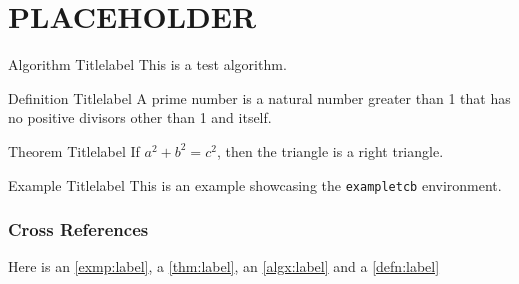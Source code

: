 \chapter{PLACEHOLDER}

\lipsum[1-10]

\begin{algorithmtcb}{Algorithm Title}{label}
    This is a test algorithm.
\end{algorithmtcb}

\begin{definitiontcb}{Definition Title}{label}
    A prime number is a natural number greater than 1 that has no positive divisors other than 1 and itself.
\end{definitiontcb}

\begin{theoremtcb}{Theorem Title}{label}
    If $a^2 + b^2 = c^2$, then the triangle is a right triangle.
\end{theoremtcb}

\begin{exampletcb}{Example Title}{label}
    This is an example showcasing the \texttt{exampletcb} environment.
\end{exampletcb}

\subsection{Cross References}
Here is an \cref{exmp:label}, a \cref{thm:label}, an \cref{algx:label} and a \cref{defn:label}
